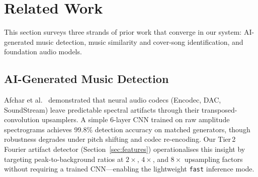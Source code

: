 \documentclass[11pt,a4paper]{article}
\begin{document}
\begin{abstract}
\begin{itemize}[nosep]
  \item \textbf{Active in training (1, 5):} (1)~Fourier artifact detection targeting deconvolution-induced spectral peaks from AI generators, (5)~expanded augmentation robustness with $n=5$ pre-computed variants per training file.
  \item \textbf{Inference-only (2):} (2)~lyrics and speech analysis via Whisper ASR, SBERT, Wav2Vec2, and Silero VAD---used in \texttt{compare\_tracks.py} but \textbf{not} part of the training pipeline.
  \item \textbf{Implemented, available via CLI flags (3--4):} (3)~a dual-stream encoder with cross-attention and gated fusion (\texttt{--dual-stream}), (4)~segment-level structural analysis with a Transformer encoder (\texttt{--use-segment-transformer}). These are fully implemented but were \textbf{not used} in the default training configuration or submitted results---see Section~\ref{sec:model}.
  \item \textbf{Implemented, not executed (6--8):} (6)~contrastive pre-training with NT-Xent loss (\texttt{pretrain.py}), (7)~Optuna hyperparameter tuning (\texttt{tune.py}), and (8)~knowledge distillation for lightweight inference (\texttt{distill.py}). These were not run due to time constraints but are fully implemented and ready for use.
\end{itemize}

\end{abstract}


\section{Related Work}
\label{sec:related-work}

This section surveys three strands of prior work that converge in our system: AI-generated music detection, music similarity and cover-song identification, and foundation audio models.

\subsection{AI-Generated Music Detection}

Afchar et al.~\cite{A1} demonstrated that neural audio codecs (Encodec, DAC, SoundStream) leave predictable spectral artifacts through their transposed-convolution upsamplers. A simple 6-layer CNN trained on raw amplitude spectrograms achieves 99.8\% detection accuracy on matched generators, though robustness degrades under pitch shifting and codec re-encoding. Our Tier\,2 Fourier artifact detector (Section~\ref{sec:features}) operationalises this insight by targeting peak-to-background ratios at $2\times$, $4\times$, and $8\times$ upsampling factors without requiring a trained CNN---enabling the lightweight \texttt{fast} inference mode.
\end{document}
